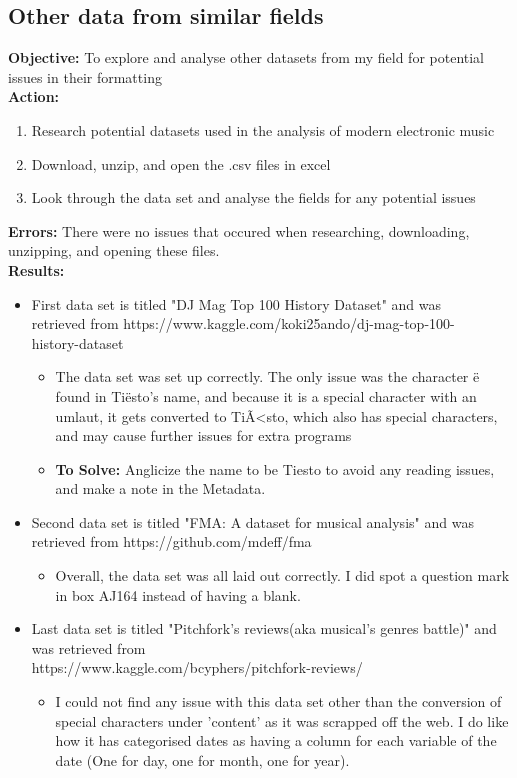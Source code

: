 \documentclass{article}
\begin{document}
\subsection{Other data from similar fields}
\textbf{Objective:} To explore and analyse other datasets from my field for potential issues in their formatting\\
\textbf{Action:}
\begin{enumerate}
    \item Research potential datasets used in the analysis of modern electronic music
    \item Download, unzip, and open the .csv files in excel
    \item Look through the data set and analyse the fields for any potential issues
\end{enumerate}
\textbf{Errors:} There were no issues that occured when researching, downloading, unzipping, and opening these files. \\
\textbf{Results:}
\begin{itemize}
    \item First data set is titled "DJ Mag Top 100 History Dataset" and was \\ retrieved from https://www.kaggle.com/koki25ando/dj-mag-top-100-\\history-dataset
    \begin{itemize}
        \item  The data set was set up correctly. The only issue was the character ë found in Tiësto's name, and because it is a special character with an umlaut, it gets converted to TiÃ<sto, which also has special characters, and may cause further issues for extra programs
        \item \textbf{To Solve:} Anglicize the name to be Tiesto to avoid any reading issues, and make a note in the Metadata.
    \end{itemize}
    \item Second data set is titled "FMA: A dataset for musical analysis" and was retrieved from https://github.com/mdeff/fma
    \begin{itemize}
        \item Overall, the data set was all laid out correctly. I did spot a question mark in box AJ164 instead of having a blank.
    \end{itemize}
    \item Last data set is titled "Pitchfork's reviews(aka musical's genres battle)" and was retrieved from \\https://www.kaggle.com/bcyphers/pitchfork-reviews/
    \begin{itemize}
        \item I could not find any issue with this data set other than the conversion of special characters under 'content' as it was scrapped off the web. I do like how it has categorised dates as having a column for each variable of the date (One for day, one for month, one for year).
    \end{itemize}
\end{itemize}
\end{document}
